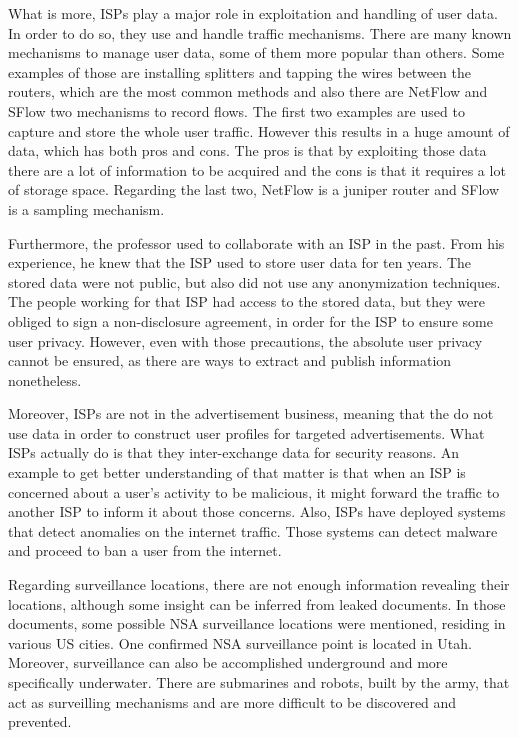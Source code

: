 What is more, ISPs play a major role in exploitation and handling of user data. 
In order to do so, they use and handle traffic mechanisms. There are many known 
mechanisms to manage user data, some of them more popular than others. Some 
examples of those are installing splitters and tapping the wires between the 
routers, which are the most common methods and also there are NetFlow and SFlow 
two mechanisms to record flows. The first two examples are used to capture and 
store the whole user traffic. However this results in a huge amount of data, 
which has both pros and cons. The pros is that by exploiting those data there 
are a lot of information to be acquired and the cons is that it requires a lot 
of storage space. Regarding the last two, NetFlow is a juniper router and SFlow 
is a sampling mechanism.

Furthermore, the professor used to collaborate with an ISP in the past. From his 
experience, he knew that the ISP used to store user data for ten years. The 
stored data were not public, but also did not use any anonymization techniques. 
The people working for that ISP had access to the stored data, but they were 
obliged to sign a non-disclosure agreement, in order for the ISP to ensure some 
user privacy. However, even with those precautions, the absolute user privacy 
cannot be ensured, as there are ways to extract and publish information 
nonetheless. 

Moreover, ISPs are not in the advertisement business, meaning that the do not 
use data in order to construct user profiles for targeted advertisements. What 
ISPs actually do is that they inter-exchange data for security reasons. An 
example to get better understanding of that matter is that when an ISP is 
concerned about a user's activity to be malicious, it might forward the traffic 
to another ISP to inform it about those concerns. Also, ISPs have deployed 
systems that detect anomalies on the internet traffic. Those systems can detect 
malware and proceed to ban a user from the internet.

Regarding surveillance locations, there are not enough information revealing 
their locations, although some insight can be inferred from leaked documents. 
In those documents, some possible NSA surveillance locations were mentioned, 
residing in various US cities. One confirmed NSA surveillance point is located 
in Utah. Moreover, surveillance can also be accomplished underground and more 
specifically underwater. There are submarines and robots, built by the army, 
that act as surveilling mechanisms and are more difficult to be discovered and 
prevented.

